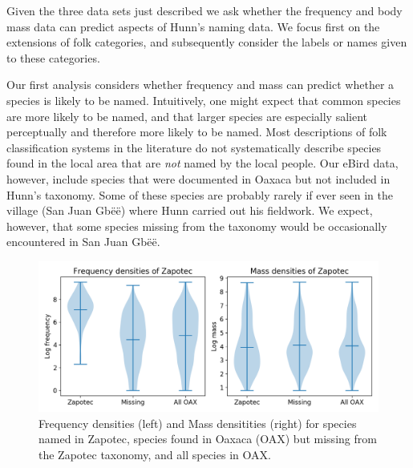 \documentclass[10pt,letterpaper]{article}
\begin{document}
Given the three data sets just described we ask whether the frequency and body mass data can predict aspects of Hunn's naming data.  We focus first on the extensions of folk categories, and subsequently consider the labels or names given to these categories. 

Our first analysis considers whether frequency and mass can predict whether a species is likely to be named. Intuitively, one might expect that common species are more likely to be named, and that larger species are especially salient perceptually and therefore more likely to be named. Most descriptions of folk classification systems in the literature do not systematically describe species found in the local area that are \emph{not} named by the local people. Our eBird data, however, include species that were documented in Oaxaca but not included in Hunn's taxonomy. Some of these species are probably rarely if ever seen in the village (San Juan Gb\"{e}\"{e}) where Hunn carried out his fieldwork. We expect, however, that some species missing from the taxonomy would be occasionally encountered in San Juan Gb\"{e}\"{e}. 

\begin{figure}[hbt!]
  \begin{center}
    \includegraphics[width=.95\textwidth]{./figures/birdfreqmass-violinplots.png}
        \caption{Frequency densities (left) and Mass densitities (right) for species named in Zapotec, species found in Oaxaca (OAX) but missing from the Zapotec taxonomy, and all species in OAX.}
        \label{fig-birdfreqmassviolin}
  \end{center}
\end{figure}
\end{document}
